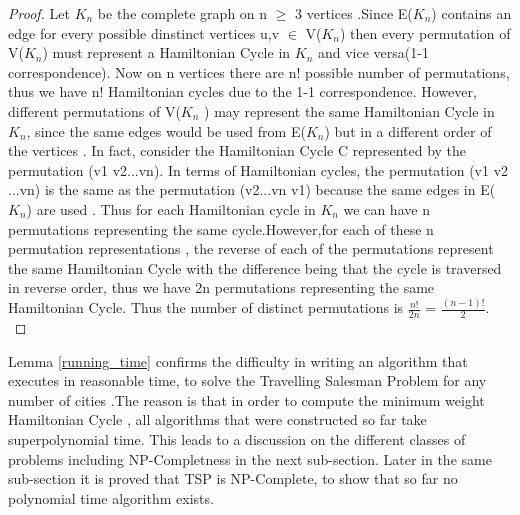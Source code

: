 \documentclass{article}
\begin{document}
\begin{proof}
Let $K_n$ be the complete graph on n $\geq$ 3 vertices .Since E($K_n$) contains an edge for every possible dinstinct vertices u,v $\in$ V($K_n$) then every permutation of V($K_n$) must represent a Hamiltonian Cycle in $K_n$ and vice versa(1-1 correspondence). Now on n vertices there are n! possible number of permutations, thus we have n! Hamiltonian cycles due to the 1-1 correspondence. However, different permutations of V($K_n$ ) may represent the same Hamiltonian Cycle in $K_n$, since the same edges would be used from E($K_n$) but in a different order of the vertices . In fact, consider the Hamiltonian Cycle C represented by the permutation (v1 v2...vn). In terms of Hamiltonian cycles, the permutation (v1 v2 ...vn) is the same as the permutation (v2...vn v1) because the same edges in E($K_n$) are used . Thus for each Hamiltonian cycle in $K_n$ we can have n permutations representing the same cycle.However,for each of these n permutation representations , the reverse of each of the permutations represent the same Hamiltonian Cycle with the difference being that the cycle is traversed in reverse order, thus we have 2n permutations representing the same Hamiltonian Cycle. Thus the number of distinct permutations is $\frac{n!}{2n}$ = $\frac{(n-1)!}{2}$. \cite{mathematics_stack_exchange_2012}
\end{proof}
Lemma \ref{running_time} confirms the difficulty in writing an algorithm that executes in reasonable time, to solve the Travelling Salesman Problem for any number of cities .The reason is that in order to compute the minimum weight Hamiltonian Cycle , all algorithms that were constructed so far take superpolynomial time. This leads to a discussion on the different classes of problems including NP-Completness in the next sub-section. Later in the same sub-section it is proved that TSP is NP-Complete, to show that so far no polynomial time algorithm exists.
\end{document}

